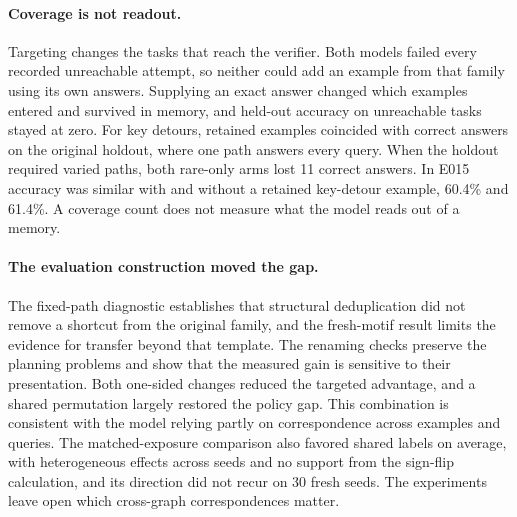 \documentclass[11pt]{article}
\begin{document}
\paragraph{Coverage is not readout.} Targeting changes the tasks that
reach the verifier. Both models failed every recorded unreachable
attempt, so neither could add an example from that family using its
own answers. Supplying an exact answer changed which examples entered and
survived in memory, and held-out accuracy on unreachable tasks stayed
at zero. For key detours, retained examples coincided with correct
answers on the original holdout, where one path answers every query.
When the holdout required varied paths, both rare-only arms lost 11
correct answers. In E015 accuracy was similar with and without a retained
key-detour example, 60.4\% and 61.4\%. A coverage count does not
measure what the model reads out of a memory.

\paragraph{The evaluation construction moved the gap.} The fixed-path
diagnostic establishes that structural deduplication did not remove a
shortcut from the original family, and the fresh-motif result limits
the evidence for transfer beyond that template. The renaming checks
preserve the planning problems and show that the measured gain is
sensitive to their presentation. Both one-sided changes reduced the
targeted advantage, and a shared permutation largely restored the
policy gap. This combination is consistent with the model relying
partly on correspondence across examples and queries. The
matched-exposure comparison also favored shared labels on average,
with heterogeneous effects across seeds and no support from the
sign-flip calculation, and its direction did not recur on 30 fresh
seeds. The experiments leave open which cross-graph correspondences
matter.
\end{document}
